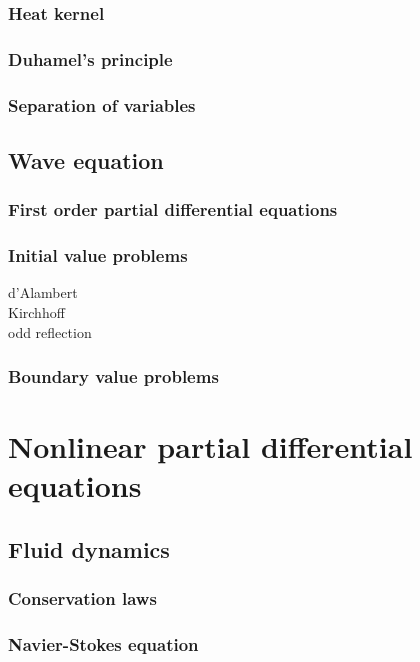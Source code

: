 \documentclass{../../large}
\begin{document}
\section{Heat kernel}
\section{Duhamel's principle}
\section{Separation of variables}






\chapter{Wave equation}
\section{First order partial differential equations}
\section{Initial value problems}
d'Alambert\\
Kirchhoff\\
odd reflection

\section{Boundary value problems}







\part{Nonlinear partial differential equations}

\chapter{Fluid dynamics}
\section{Conservation laws}
\section{Navier-Stokes equation}
\end{document}
